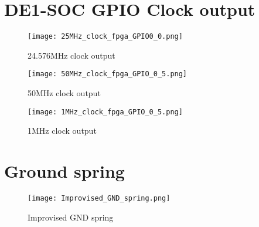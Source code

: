 \newpage

\section{DE1-SOC GPIO Clock output} \label{Appendix-DE1-SOC GPIO Clock output}
\begin{figure}[!htb]
    \texttt{[image: 25MHz\_clock\_fpga\_GPIO0\_0.png]}
   \label{fig:Appendix-24.576MHz clock output}
   \caption{24.576MHz clock output}
\end{figure}
\begin{figure}[!htb]
    \texttt{[image: 50MHz\_clock\_fpga\_GPIO\_0\_5.png]}
    \caption{50MHz clock output}
   \label{fig:Appendix-50MHz clock output}
\end{figure}
\begin{figure}[!htb]
    \texttt{[image: 1MHz\_clock\_fpga\_GPIO\_0\_5.png]}
    \caption{1MHz clock output}
   \label{fig:Appendix-1MHz clock output}
\end{figure}
\newpage


\section{Ground spring} \label{Appendix-Ground-spring}
\begin{figure}[!htb]
    \texttt{[image: Improvised\_GND\_spring.png]}
    \caption{Improvised GND spring}
    \label{fig:Improvised_GND_spring}
\end{figure}